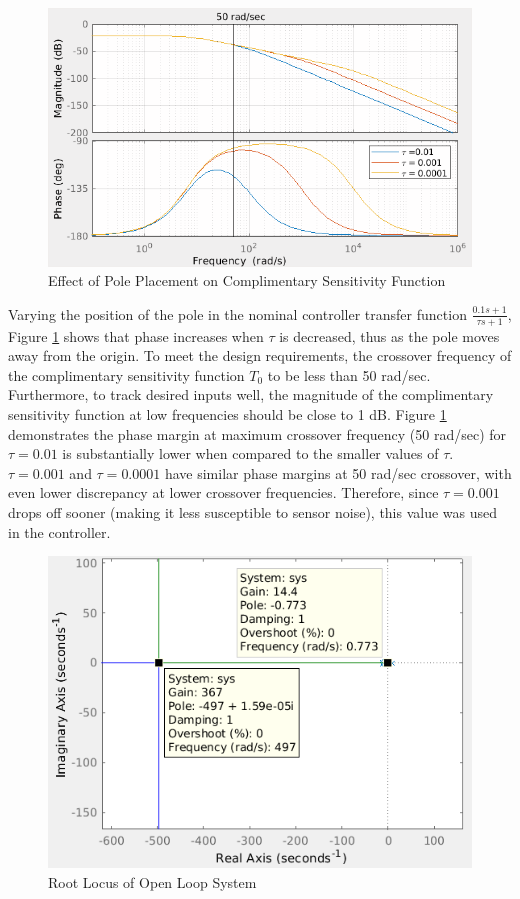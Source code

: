 \documentclass[11pt, a4paper,twocolumn]{article}
\begin{document}
			\begin{figure}[ht!]
			\centering
			\includegraphics[scale=0.35]{vary_p}
			\caption{Effect of Pole Placement on Complimentary Sensitivity Function}
			\label{fig:vary_p}
			\end{figure}			
			
			Varying the position of the pole in the nominal controller transfer function $ \frac{0.1s + 1}{\tau s + 1} $, Figure \ref{fig:vary_p} shows that phase increases when $ \tau $ is decreased, thus as the pole moves away from the origin. To meet the design requirements, the crossover frequency of the complimentary sensitivity function $T_0$ to be less than 50 rad/sec. Furthermore, to track desired inputs well, the magnitude of  the complimentary sensitivity function at low frequencies should be close to 1 dB. Figure \ref{fig:vary_p} demonstrates the phase margin at maximum crossover frequency (50 rad/sec) for $ \tau = 0.01 $ is substantially lower when compared to the smaller values of $ \tau $. $ \tau = 0.001 $ and $ \tau = 0.0001 $ have similar phase margins at 50 rad/sec crossover, with even lower discrepancy at lower crossover frequencies. Therefore, since $ \tau = 0.001 $ drops off sooner (making it less susceptible to sensor noise), this value was used in the controller.

			\begin{figure}[ht!]
			\centering
			\includegraphics[scale=0.4]{rlocus_sys}
			\caption{Root Locus of Open Loop System}
			\label{fig:rlocus_sys}
			\end{figure}									
			
\end{document}
